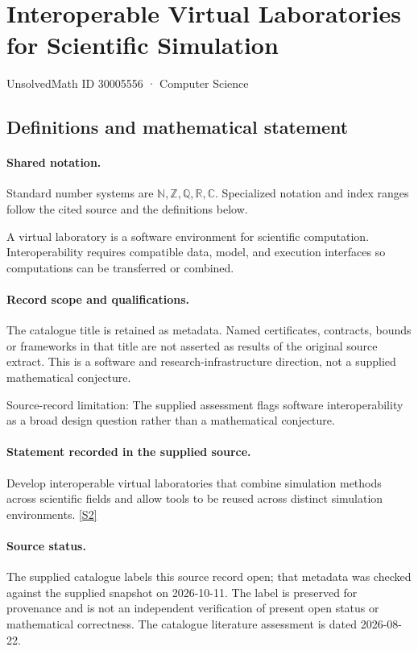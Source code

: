 \documentclass[11pt]{article}
\newcommand{\sref}[2]{\hyperlink{source:#1:#2}{[S#2]}}
\begin{document}
\setcounter{section}{30005555}
\section{Interoperable Virtual Laboratories for Scientific Simulation}\label{30005556}
{\small\sffamily UnsolvedMath ID 30005556 · Computer Science}
\subsection{Definitions and mathematical statement}

\paragraph{Shared notation.}Standard number systems are $\mathbb N,\mathbb Z,\mathbb Q,\mathbb R,\mathbb C$. Specialized notation and index ranges follow the cited source and the definitions below.


A virtual laboratory is a software environment for scientific computation. Interoperability requires compatible data, model, and execution interfaces so computations can be transferred or combined.
\paragraph{Record scope and qualifications.}
The catalogue title is retained as metadata. Named certificates, contracts, bounds or frameworks in that title are not asserted as results of the original source extract.
This is a software and research-infrastructure direction, not a supplied mathematical conjecture.

Source-record limitation: The supplied assessment flags software interoperability as a broad design question rather than a mathematical conjecture.
\paragraph{Statement recorded in the supplied source.}
Develop interoperable virtual laboratories that combine simulation methods across scientific fields and allow tools to be reused across distinct simulation environments. \sref{30005556}{2}
\paragraph{Source status.}
The supplied catalogue labels this source record open; that metadata was checked against the supplied snapshot on 2026-10-11. The label is preserved for provenance and is not an independent verification of present open status or mathematical correctness. The catalogue literature assessment is dated 2026-08-22.
\end{document}
